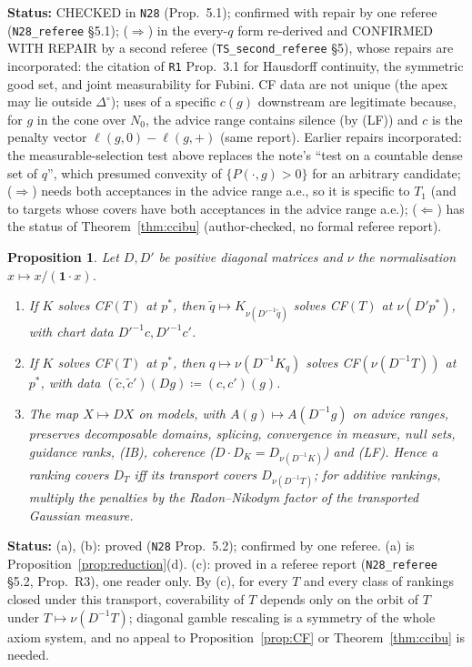 \documentclass[11pt]{article}
\newtheorem{proposition}[theorem]{Proposition}
\theoremstyle{definition}
\theoremstyle{remark}
\newcommand{\one}{\mathbf 1}
\newcommand{\Di}{\Delta^{\circ}}
\newcommand{\src}[1]{\texttt{#1}}
\newcommand{\status}[1]{\par\smallskip\noindent\textbf{Status:} #1\par\smallskip}
\begin{document}
\status{CHECKED in \src{N28} (Prop.~5.1); confirmed with repair by one referee (\src{N28\_referee} \S5.1); ($\Rightarrow$) in the every-$q$ form re-derived and CONFIRMED WITH REPAIR by a second referee (\src{TS\_second\_referee} \S5), whose repairs are incorporated: the citation of \src{R1} Prop.~3.1 for Hausdorff continuity, the symmetric good set, and joint measurability for Fubini. CF data are not unique (the apex may lie outside $\Di$); uses of a specific $c(g)$ downstream are legitimate because, for $g$ in the cone over $N_0$, the advice range contains silence (by (LF)) and $c$ is the penalty vector $\ell(g,0)-\ell(g,+)$ (same report). Earlier repairs incorporated: the measurable-selection test above replaces the note's ``test on a countable dense set of $q$'', which presumed convexity of $\{P(\cdot,g)>0\}$ for an arbitrary candidate; ($\Rightarrow$) needs both acceptances in the advice range a.e., so it is specific to $T_1$ (and to targets whose covers have both acceptances in the advice range a.e.); ($\Leftarrow$) has the status of Theorem~\ref{thm:ccibu} (author-checked, no formal referee report).}

\begin{proposition}\label{prop:diag}
Let $D,D'$ be positive diagonal matrices and $\nu$ the normalisation $x\mapsto x/(\one\cdot x)$.
\begin{enumerate}[leftmargin=*,label=(\alph*)]
\item If $K$ solves CF$(T)$ at $p^*$, then $\tilde q\mapsto K_{\nu(D'^{-1}\tilde q)}$ solves CF$(T)$ at $\nu(D'p^*)$, with chart data $D'^{-1}c,D'^{-1}c'$.
\item If $K$ solves CF$(T)$ at $p^*$, then $q\mapsto\nu(D^{-1}K_q)$ solves CF$(\nu(D^{-1}T))$ at $p^*$, with data $(\tilde c,\tilde c')(Dg)\coloneqq(c,c')(g)$.
\item The map $X\mapsto DX$ on models, with $A(g)\mapsto A(D^{-1}g)$ on advice ranges, preserves decomposable domains, splicing, convergence in measure, null sets, guidance ranks, (IB), coherence ($D\cdot D_K=D_{\nu(D^{-1}K)}$) and (LF). Hence a ranking covers $D_T$ iff its transport covers $D_{\nu(D^{-1}T)}$; for additive rankings, multiply the penalties by the Radon--Nikodym factor of the transported Gaussian measure.
\end{enumerate}
\end{proposition}
\status{(a), (b): proved (\src{N28} Prop.~5.2); confirmed by one referee. (a) is Proposition~\ref{prop:reduction}(d). (c): proved in a referee report (\src{N28\_referee} \S5.2, Prop.~R3), one reader only. By (c), for every $T$ and every class of rankings closed under this transport, coverability of $T$ depends only on the orbit of $T$ under $T\mapsto\nu(D^{-1}T)$; diagonal gamble rescaling is a symmetry of the whole axiom system, and no appeal to Proposition~\ref{prop:CF} or Theorem~\ref{thm:ccibu} is needed.}
\end{document}
